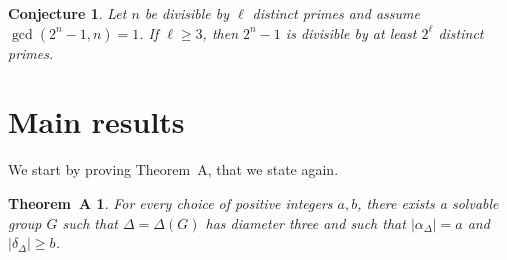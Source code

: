\documentclass{amsart}
\newtheorem*{thmA}{Theorem~A}
\newtheorem{conjecture}[theorem]{Conjecture}
\begin{document}
\begin{conjecture}\label{conj:1}{\rm
Let $n$ be divisible by $\ell$ distinct primes and assume $\gcd(2^n-1,n)=1$. If $\ell\ge 3$, then $2^n-1$ is divisible by at least $2^\ell$ distinct primes.}
\end{conjecture}

\section{Main results}



We start by proving Theorem~A, that we state again.
\begin{thmA}
  For every choice of positive integers $a, b$, there exists a solvable group $G$ such that $\Delta = \Delta(G)$ has diameter three and
  such that $|\alpha_{\Delta}| =  a$ and  $|\delta_{\Delta}| \geq b$.
\end{thmA}
\end{document}
